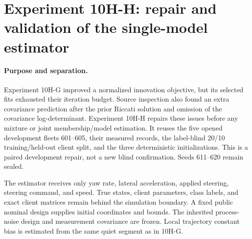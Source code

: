 \section{Experiment 10H-H: repair and validation of the single-model estimator}
\label{sec:experiment10hh}

\paragraph{Purpose and separation.}
Experiment 10H-G improved a normalized innovation objective, but its selected
fits exhausted their iteration budget. Source inspection also found an extra
covariance prediction after the prior Riccati solution and omission of the
covariance log-determinant. Experiment 10H-H repairs these issues before any
mixture or joint membership/model estimation. It reuses the five opened
development fleets 601--605, their measured records, the label-blind 20/10
training/held-out client split, and the three deterministic initializations.
This is a paired development repair, not a new blind confirmation. Seeds
611--620 remain sealed.

The estimator receives only yaw rate, lateral acceleration, applied steering,
steering command, and speed. True states, client parameters, class labels,
and exact client matrices remain behind the simulation boundary. A fixed
public nominal design supplies initial coordinates and bounds. The inherited
process-noise design and measurement covariance are frozen. Local trajectory
constant bias is estimated from the same quiet segment as in 10H-G.

